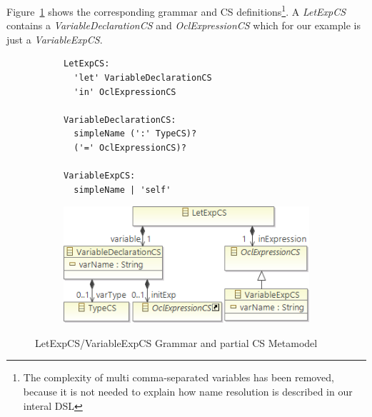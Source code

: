 \documentclass{llncs}
\begin{document}
Figure~\ref{fig:LetExpCS} shows the corresponding grammar and CS definitions\footnote{The complexity of multi comma-separated variables has been removed, because it is not needed to explain how name resolution is described in our interal DSL}. A \emph{LetExpCS} contains a \emph{VariableDeclarationCS} and \emph{OclExpressionCS} which for our example is just a \emph{VariableExpCS}. 
\begin{figure}[htbp]
\centering
\begin{subfigure}{0.45\textwidth}
  \centering
  \begin{lstlisting}[label=lst:letExpEBNF, language=Xtext]
LetExpCS:
  'let' VariableDeclarationCS 
  'in' OclExpressionCS
  	
VariableDeclarationCS:
  simpleName (':' TypeCS)?
  ('=' OclExpressionCS)?	

VariableExpCS:
  simpleName | 'self'
  \end{lstlisting} 
\end{subfigure}%
\begin{subfigure}{0.55\textwidth}
  \centering
  \includegraphics[scale=0.5]{images/LetExpCS.png}
\end{subfigure}
\caption{LetExpCS/VariableExpCS Grammar and partial CS Metamodel}
\label{fig:LetExpCS}
\end{figure}

\end{document}
